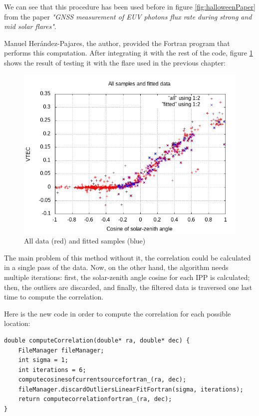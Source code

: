 We can see that this procedure has been used before in figure \ref{fig:halloweenPaper} from the paper \textit{"GNSS measurement of EUV photons flux rate during strong and mid solar flares"}\cite{hernandez2012gnss}.

Manuel Herández-Pajares, the author, provided the Fortran program that performs this computation. After integrating it with the rest of the code, figure \ref{fig:linearFit} shows the result of testing it with the flare used in the previous chapter:

\begin{figure}[!htb]
	\begin{centering}
	\includegraphics[width=0.5\linewidth]{images/ch6/linearFit/resultAll.png}
		\caption{All data (red) and fitted samples (blue)}
		\label{fig:linearFit}
	\end{centering}
\end{figure}

The main problem of this method without it, the correlation could be calculated in a single pass of the data. Now, on the other hand, the algorithm needs multiple iterations: first, the solar-zenith angle cosine for each IPP is calculated; then, the outliers are discarded, and finally, the filtered data is traversed one last time to compute the correlation.

Here is the new code in order to compute the correlation for each possible location:

\begin{minipage}{\linewidth}
\begin{lstlisting}[style=myCStyle, caption=Discarding outliers and computing the correlation]
double computeCorrelation(double* ra, double* dec) {
	FileManager fileManager;
	int sigma = 1;
	int iterations = 6;
	computecosinesofcurrentsourcefortran_(ra, dec);
	fileManager.discardOutliersLinearFitFortran(sigma, iterations);
	return computecorrelationfortran_(ra, dec);
}\end{lstlisting}
\end{minipage}

